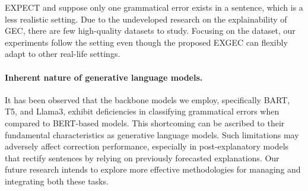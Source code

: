 EXPECT and \Dataset{} suppose only one grammatical error exists in a sentence, which is a less realistic setting. Due to the undeveloped research on the explainability of GEC, there are few high-quality datasets to study. Focusing on the \Dataset{} dataset, our experiments follow the setting even though the proposed EXGEC can flexibly adapt to other real-life settings.

\paragraph{Inherent nature of generative language models.}
It has been observed that the backbone models we employ, specifically BART, T5, and Llama3, exhibit deficiencies in classifying grammatical errors when compared to BERT-based models. This shortcoming can be ascribed to their fundamental characteristics as generative language models. Such limitations may adversely affect correction performance, especially in post-explanatory models that rectify sentences by relying on previously forecasted explanations. Our future research intends to explore more effective methodologies for managing and integrating both these tasks.




